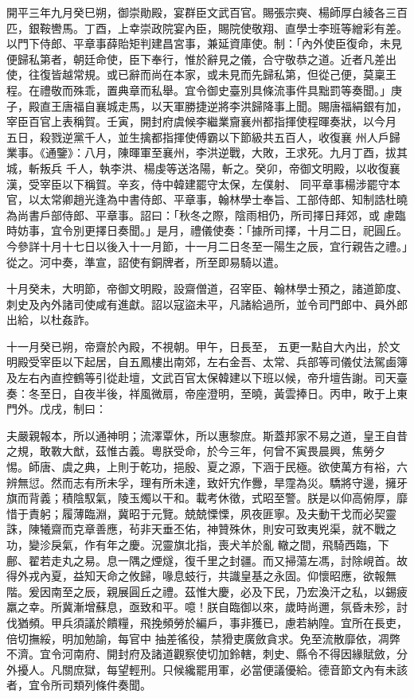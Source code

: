 
\begin{pinyinscope}

 開平三年九月癸巳朔，御崇勛殿，宴群臣文武百官。賜張宗奭、楊師厚白綾各三百匹，銀鞍轡馬。丁酉，上幸崇政院宴內臣，賜院使敬翔、直學士李班等繒彩有差。以門下侍郎、平章事薛貽矩判建昌宮事，兼延資庫使。制：「內外使臣復命，未見便歸私第者，朝廷命使，臣下奉行，惟於辭見之儀，合守敬恭之道。近者凡差出使，往復皆越常規。或已辭而尚在本家，或未見而先歸私第，但從己便，莫稟王程。在禮敬而殊乖，置典章而私舉。宜令御史臺別具條流事件具黜罰等奏聞。」庚子，殿直王唐福自襄城走馬，以天軍勝捷逆將李洪歸降事上聞。賜唐福絹銀有加，宰臣百官上表稱賀。壬寅，開封府虞候李繼業齎襄州都指揮使程暉奏狀，以今月
 五日，殺戮逆黨千人，並生擒都指揮使傅霸以下節級共五百人，收復襄
 州人戶歸業事。《通鑒》：八月，陳暉軍至襄州，李洪逆戰，大敗，王求死。九月丁酉，拔其城，斬叛兵
 千人，執李洪、楊虔等送洛陽，斬之。癸卯，帝御文明殿，以收復襄漢，受宰臣以下稱賀。辛亥，侍中韓建罷守太保，左僕射、
 同平章事楊涉罷守本官，以太常卿趙光逢為中書侍郎、平章事，翰林學士奉旨、工部侍郎、知制誥杜曉為尚書戶部侍郎、平章事。詔曰：「秋冬之際，陰雨相仍，所司擇日拜郊，或
 慮臨時妨事，宜令別更擇日奏聞。」是月，禮儀使奏：「據所司擇，十月二日，祀圓丘。今參詳十月十七日以後入十一月節，十一月二日冬至一陽生之辰，宜行親告之禮。」從之。河中奏，準宣，詔使有銅牌者，所至即易騎以遣。



 十月癸未，大明節，帝御文明殿，設齋僧道，召宰臣、翰林學士預之，諸道節度、刺史及內外諸司使咸有進獻。詔以寇盜未平，凡諸給過所，並令司門郎中、員外郎出給，以杜姦詐。



 十一月癸已朔，帝齋於內殿，不視朝。甲午，日長至，
 五更一點自大內出，於文明殿受宰臣以下起居，自五鳳樓出南郊，左右金吾、太常、兵部等司儀仗法駕鹵簿及左右內直控鶴等引從赴壇，文武百官太保韓建以下班以候，帝升壇告謝。司天臺奏：冬至日，自夜半後，祥風微扇，帝座澄明，至曉，黃雲捧日。丙申，畋于上東門外。戊戌，制曰：



 夫嚴親報本，所以通神明；流澤覃休，所以惠黎庶。斯蓋邦家不易之道，皇王自昔之規，敢斁大猷，茲惟古義。粵朕受命，於今三年，何曾不寅畏晨興，焦勞夕
 惕。師唐、虞之典，上則于乾功，挹殷、夏之源，下涵于民極。欲使萬方有裕，六辨無愆。然而志有所未孚，理有所未達，致奸宄作釁，旱霪為災。驕將守邊，擁牙旗而背義；積陰馭氣，陵玉燭以干和。載考休徵，式昭至警。朕是以仰高俯厚，靡惜于責躬；履薄臨淵，冀昭于元覽。兢兢慄慄，夙夜匪寧。及夫動干戈而必契靈誅，陳犧齋而克章善應，茍非天垂丕佑，神贊殊休，則安可致夷兇渠，就不戰之功，變沴戾氣，作有年之慶。況靈旗北指，喪犬羊於亂
 轍之間，飛騎西臨，下鄜、翟若走丸之易。息一隅之煙燧，復千里之封疆。而又掃蕩左馮，討除峴首。故得外戎內夏，益知天命之攸歸，喙息蚑行，共識皇基之永固。仰懷昭應，欲報無階。爰因南至之辰，親展圓丘之禮。茲惟大慶，必及下民，乃宏渙汗之私，以錫疲羸之幸。所冀漸增蘇息，亟致和平。噫！朕自臨御以來，歲時尚邇，氛昏未殄，討伐猶頻。甲兵須議於饋糧，飛挽頻勞於編戶，事非獲已，慮若納隍。宜所在長吏，倍切撫綏，明加勉諭，每官中
 抽差徭役，禁猾吏廣斂貪求。免至流散靡依，凋弊不濟。宜令河南府、開封府及諸道觀察使切加鈴轄，刺史、縣令不得因緣賦斂，分外擾人。凡關庶獄，每望輕刑。只候纔罷用軍，必當便議優給。德音節文內有未該者，宜令所司類列條件奏聞。




\end{pinyinscope}
